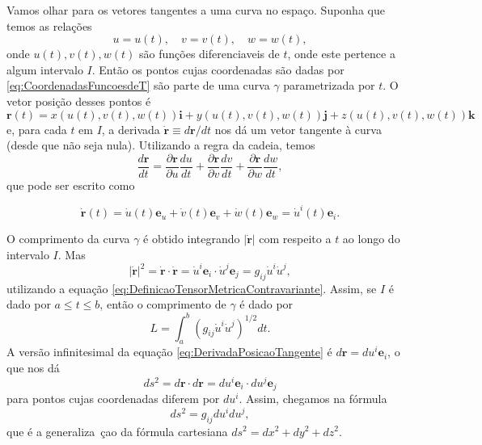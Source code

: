 Vamos olhar para os vetores tangentes a uma curva no espaço.
Suponha que temos as relações
\begin{equation}\label{eq:CoordenadasFuncoesdeT}
	u=u(t), \quad v=v(t), \quad w=w(t) ,
\end{equation}
onde $u(t),v(t),w(t)$ são funções diferenciaveis de $t$, onde este pertence a algum intervalo $I$. Então os pontos cujas coordenadas são dadas por \eqref{eq:CoordenadasFuncoesdeT} são parte de uma curva $\gamma$ parametrizada por $t$. O vetor posição desses pontos é 
\[
	\mathbf{r}(t)=x(u(t), v(t), w(t)) \mathbf{i}+y(u(t), v(t), w(t)) \mathbf{j}+z(u(t), v(t), w(t)) \mathbf{k}	
\]
e, para cada $t$ em $I$, a derivada $\dot{\mathbf{r}} \equiv d\mathbf{r}/dt$ nos dá um vetor tangente à curva (desde que não seja nula). Utilizando a regra da cadeia, temos
\[
	\frac{d \mathbf{r}}{d t}=\frac{\partial \mathbf{r}}{\partial u} \frac{d u}{d t}+\frac{\partial \mathbf{r}}{\partial v} \frac{d v}{d t}+\frac{\partial \mathbf{r}}{\partial w} \frac{d w}{d t} ,
\]
que pode ser escrito como

\begin{equation}\label{eq:DerivadaPosicaoTangente}
	\dot{\mathbf{r}}(t)=\dot{u}(t)\mathbf{e}_u+\dot{v}(t)\mathbf{e}_v+\dot{w}(t)\mathbf{e}_w = \dot{u}^i(t)\mathbf{e}_i.
\end{equation}

O comprimento da curva $\gamma$ é obtido integrando $|\dot{\mathbf{r}}|$ com respeito a $t$ ao longo do intervalo $I$. Mas
\[
	|\dot{\mathbf{r}}|^{2}=\dot{\mathbf{r}} \cdot \dot{\mathbf{r}}=\dot{u}^{i} \mathbf{e}_{i} \cdot \dot{u}^{j} \mathbf{e}_{j}=g_{i j} \dot{u}^{i} \dot{u}^{j},
\]
utilizando a equação \eqref{eq:DefinicaoTensorMetricaContravariante}. Assim, se $I$ é dado por $a\leq t\leq b$, então o comprimento de $\gamma$ é dado por
\begin{equation}\label{eq:ComprimentoCurva}
	\boxed{
	L=\int_{a}^{b}\left(g_{i j} \dot{u}^{i} \dot{u}^{j}\right)^{1 / 2} dt .
	}
\end{equation}
A versão infinitesimal da equação \eqref{eq:DerivadaPosicaoTangente} é $d\mathbf{r}=du^i\mathbf{e}_i$, o que nos dá
\[
	ds^2=d\mathbf{r}\cdot d\mathbf{r}=du^i\mathbf{e}_i \cdot du^j\mathbf{e}_j 
\]
para pontos cujas coordenadas diferem por $du^i$. Assim, chegamos na fórmula 
\begin{equation}
	\boxed{
		ds^2=g_{ij}du^i du^j,
	}
\end{equation}
que é a generaliza~çao da fórmula cartesiana $ds^2=dx^2+dy^2+dz^2$.

